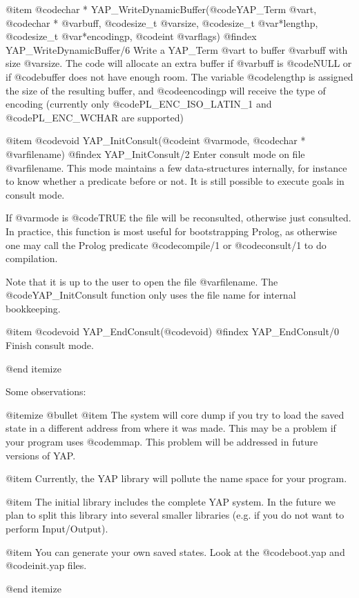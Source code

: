 @item  @code{char *} YAP_WriteDynamicBuffer(@code{YAP_Term} @var{t}, @code{char *} @var{buff}, @code{size_t} @var{size}, @code{size_t} @var{*lengthp}, @code{size_t} @var{*encodingp}, @code{int} @var{flags})
@findex  YAP_WriteDynamicBuffer/6
Write a YAP_Term @var{t} to buffer @var{buff} with size
@var{size}. The code will allocate an extra buffer if @var{buff} is
@code{NULL} or if @code{buffer} does not have enough room. The
variable @code{lengthp} is assigned the size of the resulting buffer,
and @code{encodingp} will receive the type of encoding (currently only @code{PL_ENC_ISO_LATIN_1} and @code{PL_ENC_WCHAR} are supported)

@item  @code{void} YAP_InitConsult(@code{int} @var{mode}, @code{char *} @var{filename})
@findex YAP_InitConsult/2
Enter consult mode on file @var{filename}. This mode maintains a few
data-structures internally, for instance to know whether a predicate
before or not. It is still possible to execute goals in consult mode.

If @var{mode} is @code{TRUE} the file will be reconsulted, otherwise
just consulted. In practice, this function is most useful for
bootstrapping Prolog, as otherwise one may call the Prolog predicate
@code{compile/1} or @code{consult/1} to do compilation.

Note that it is up to the user to open the file @var{filename}. The
@code{YAP_InitConsult} function only uses the file name for internal
bookkeeping.

@item  @code{void} YAP_EndConsult(@code{void})
@findex YAP_EndConsult/0
Finish consult mode.

@end itemize

Some observations:

@itemize @bullet
@item The system will core dump if you try to load the saved state in a
different address from where it was made. This may be a problem if
your program uses @code{mmap}. This problem will be addressed in future
versions of YAP.

@item Currently, the YAP library will pollute the name
space for your program.

@item The initial library includes the complete YAP system. In
the future we plan to split this library into several smaller libraries
(e.g. if you do not want to perform Input/Output).

@item You can generate your own saved states. Look at  the
@code{boot.yap} and @code{init.yap} files.

@end itemize

